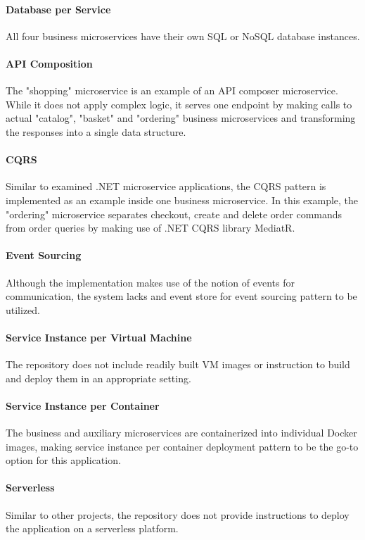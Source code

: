\documentclass{Configuration_Files/PoliMi3i_thesis}
\begin{document}
\paragraph{Database per Service} All four business microservices have their own SQL or NoSQL database instances.

\paragraph{API Composition} The "shopping" microservice is an example of an API composer microservice.
While it does not apply complex logic, it serves one endpoint by making calls to actual "catalog", "basket" and "ordering" business microservices and transforming the responses into a single data structure.

\paragraph{CQRS} Similar to examined .NET microservice applications, the CQRS pattern is implemented as an example inside one business microservice.
In this example, the "ordering" microservice separates checkout, create and delete order commands from order queries by making use of .NET CQRS library MediatR.

\paragraph{Event Sourcing} Although the implementation makes use of the notion of events for communication, the system lacks and event store for event sourcing pattern to be utilized.

\paragraph{Service Instance per Virtual Machine} The repository does not include readily built VM images or instruction to build and deploy them in an appropriate setting.

\paragraph{Service Instance per Container} The business and auxiliary microservices are containerized into individual Docker images, making service instance per container deployment pattern to be the go-to option for this application.

\paragraph{Serverless} Similar to other projects, the repository does not provide instructions to deploy the application on a serverless platform.
\end{document}
